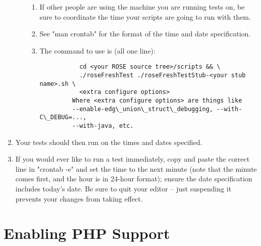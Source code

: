 \begin{enumerate}
\begin{enumerate}
\begin{enumerate}
         \item If other people are using the machine you are running tests on, be
               sure to coordinate the time your scripts are going to run with them.
         \item See "man crontab" for the format of the time and date specification.
         \item The command to use is (all one line):
\begin{verbatim}
           cd <your ROSE source tree>/scripts && \
           ./roseFreshTest ./roseFreshTestStub-<your stub name>.sh \
           <extra configure options>
         Where <extra configure options> are things like
         --enable-edg\_union\_struct\_debugging, --with-C\_DEBUG=...,
         --with-java, etc.
\end{verbatim}
      \end{enumerate}
   \end{enumerate}
   \item Your tests should then run on the times and dates specified.
   \item If you would ever like to run a test immediately, copy and paste the
   correct line in "crontab -e" and set the time to the next minute (note
   that the minute comes first, and the hour is in 24-hour format); ensure
   the date specification includes today's date.  Be sure to quit your
   editor -- just suspending it prevents your changes from taking effect.
\end{enumerate}

\section{Enabling PHP Support}

